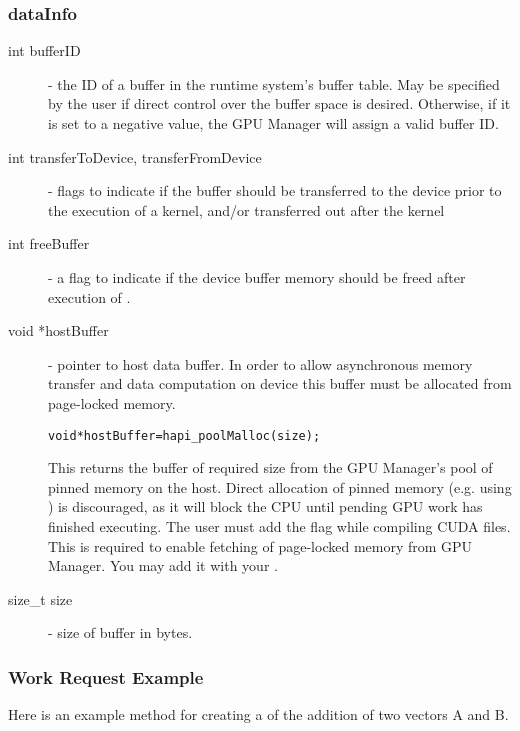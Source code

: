 \subsubsection{dataInfo}
\begin{description}
\item[int bufferID]- the ID of a buffer in the runtime system's buffer table.
May be specified by the user if direct control over the buffer space is
desired. Otherwise, if it is set to a negative value, the GPU Manager will
assign a valid buffer ID.

\item[int transferToDevice, transferFromDevice]- flags to indicate if the buffer
should be transferred to the device prior to the execution of a kernel, and/or
transferred out after the kernel

\item[int freeBuffer]- a flag to indicate if the device buffer memory should be
freed after execution of .

\item[void *hostBuffer]- pointer to host data buffer. In order to allow
asynchronous memory transfer and data computation on device this buffer must
be allocated from page-locked memory.
\begin{alltt}
void *hostBuffer = hapi\_poolMalloc(size);
\end{alltt}
This returns the buffer of required size from the GPU Manager's pool of pinned memory on the host.
Direct allocation of pinned memory (e.g. using ) is discouraged,
as it will block the CPU until pending GPU work has finished executing.
The user must add the  flag while compiling CUDA files.
This is required to enable fetching of page-locked memory from GPU Manager.
You may add it with your .

\item[size\_t size]- size of buffer in bytes.
\end{description}

\subsubsection{Work Request Example}

Here is an example method for creating a  of the addition of
two vectors A and B.

